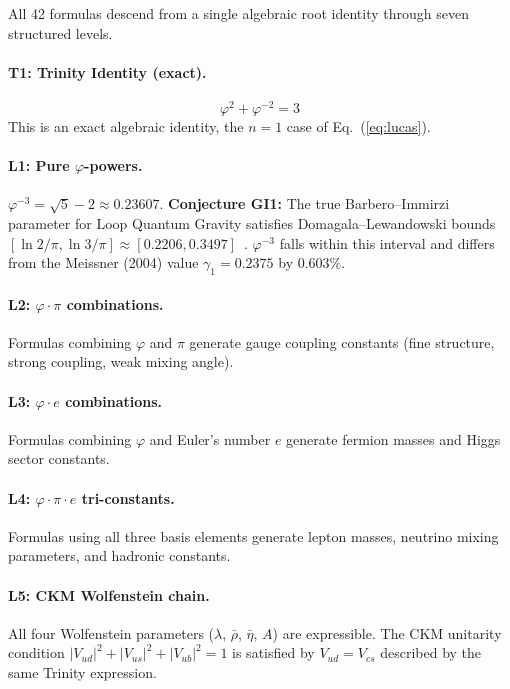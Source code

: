 \documentclass[10pt,a4paper]{article}
\begin{document}
All 42 formulas descend from a single algebraic root identity through seven structured levels.

\paragraph{T1: Trinity Identity (exact).}
\begin{equation}
  \varphi^2 + \varphi^{-2} = 3
  \label{eq:trinity}
\end{equation}
This is an exact algebraic identity, the $n=1$ case of Eq.~(\ref{eq:lucas}).

\paragraph{L1: Pure $\varphi$-powers.}
$\varphi^{-3} = \sqrt{5} - 2 \approx 0.23607$.
\textbf{Conjecture GI1:} The true Barbero--Immirzi parameter for Loop Quantum Gravity
satisfies Domagala--Lewandowski bounds $[\ln 2/\pi, \ln 3/\pi] \approx [0.2206, 0.3497]$~\cite{meissner2004}.
$\varphi^{-3}$ falls within this interval and differs from the Meissner (2004) value
$\gamma_1 = 0.2375$ by $0.603\%$.

\paragraph{L2: $\varphi\cdot\pi$ combinations.}
Formulas combining $\varphi$ and $\pi$ generate gauge coupling constants (fine structure, strong
coupling, weak mixing angle).

\paragraph{L3: $\varphi\cdot e$ combinations.}
Formulas combining $\varphi$ and Euler's number $e$ generate fermion masses and Higgs sector constants.

\paragraph{L4: $\varphi\cdot\pi\cdot e$ tri-constants.}
Formulas using all three basis elements generate lepton masses, neutrino mixing parameters, and hadronic constants.

\paragraph{L5: CKM Wolfenstein chain.}
All four Wolfenstein parameters ($\lambda$, $\bar\rho$, $\bar\eta$, $A$) are expressible.
The CKM unitarity condition $|V_{ud}|^2 + |V_{us}|^2 + |V_{ub}|^2 = 1$ is satisfied by
$V_{ud} = V_{cs}$ described by the same Trinity expression.
\end{document}
